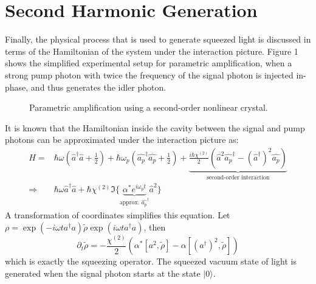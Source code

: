 \documentclass[10pt,a4paper]{report}
\newcommand*\ket[1]{|{#1}\rangle}
\begin{document}
\section{Second Harmonic Generation}
Finally, the physical process that is used to generate squeezed light is discussed in terms of the Hamiltonian of the system under the interaction picture.
Figure 1 shows the simplified experimental setup for parametric amplification, when a strong pump photon with twice the frequency of the signal photon is injected in-phase, and thus generates the idler photon.
\begin{figure}[htb]
  \centering
  \caption{Parametric amplification using a second-order nonlinear crystal.}
\end{figure}

It is known that the Hamiltonian inside the cavity between the signal and pump photons can be approximated under the interaction picture as:
\begin{align*}
  \hat{H}=    & \hbar\omega (\hat{a}^{\dag}\hat{a}+\frac{1}{2})+\hbar\omega_{p}(\hat{a_{p}}^{\dag}\hat{a_{p}}+\frac{1}{2})+\underbrace{\frac{i\hbar\chi^{(2)}}{2}(\hat{a}^{2}\hat{a_{p}}^{\dag}-(\hat{a}^{\dag})^{2}\hat{a_{p}})}_{\text{second-order interaction}} \\
  \Rightarrow & \hbar\omega\hat{a}^{\dag}\hat{a}+\hbar\chi^{(2)}\Im\{\underbrace{\alpha^{*} e^{i\omega_{p}t}}_{\text{approx. }\hat{a_{p}}^{\dag}}\hat{a}^{2}\}
\end{align*}
A transformation of coordinates simplifies this equation.
Let $\rho=\exp(-i\omega ta^{\dag}a)\tilde{\rho}\exp(i\omega ta^{\dag}a)$, then
\begin{equation}
  \partial_{t}\tilde{\rho}=-\frac{\chi^{(2)}}{2}(\alpha^{*}[a^{2},\tilde{\rho}]-\alpha[(a^{\dag})^{2},\tilde{\rho}])
\end{equation}
which is exactly the squeezing operator.
The squeezed vacuum state of light is generated when the signal photon starts at the state $\ket{0}$.
\end{document}
